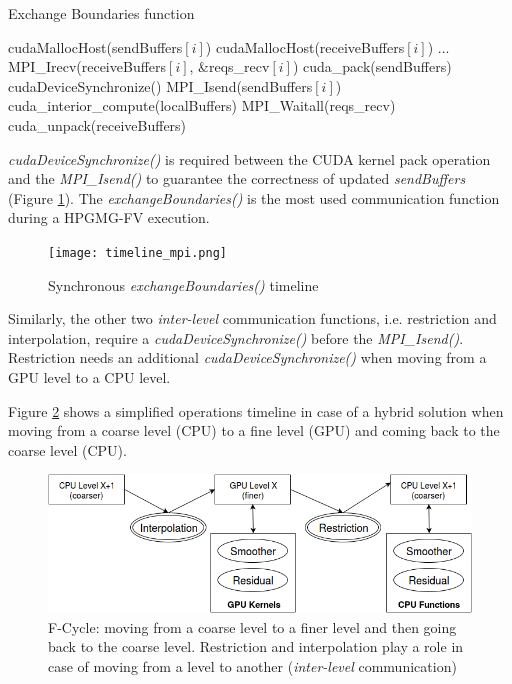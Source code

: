 \documentclass[review]{siamart1116}
\begin{document}
\begin{algorithm}
\small
\caption{Exchange Boundaries function}
\label{algo:exchange_boundaries}
\begin{algorithmic}[1]
\State cudaMallocHost(sendBuffers$[i]$)
\State cudaMallocHost(receiveBuffers$[i]$)
\EndFor
\State ...
 \label{alg:b}
                \State MPI\_Irecv(receiveBuffers$[i]$, \&reqs\_recv$[i]$)
        \EndFor
        \State cuda\_pack(sendBuffers)
        \State cudaDeviceSynchronize()
                \State MPI\_Isend(sendBuffers$[i]$)
        \EndFor
        \State cuda\_interior\_compute(localBuffers)
        \State MPI\_Waitall(reqs\_recv)
        \State cuda\_unpack(receiveBuffers)
\EndFunction
\end{algorithmic}
\end{algorithm} \textit{cudaDeviceSynchronize()} is required between the CUDA kernel
pack operation and the \textit{MPI\_Isend()} to guarantee the correctness
of updated \textit{sendBuffers} (Figure \ref{fig:timeline_mpi}).
The \textit{exchangeBoundaries()} is the most used communication function during a HPGMG-FV execution.

\begin{figure}[h]
\centering
\texttt{[image: timeline\_mpi.png]}
\caption{Synchronous \textit{exchangeBoundaries()} timeline}
\label{fig:timeline_mpi}
\end{figure}

Similarly, the other two \emph{inter-level} communication functions, i.e. restriction and interpolation, require a \textit{cudaDeviceSynchronize()} before the \textit{MPI\_Isend()}. Restriction needs an additional \textit{cudaDeviceSynchronize()} when moving from a GPU level to a CPU level.

Figure \ref{fig:hpgmg_levels} shows a simplified operations timeline
in case of a hybrid solution when moving from a coarse level (CPU) to
a fine level (GPU) and coming back to the coarse level (CPU).

\begin{figure}[h]
\centering
\includegraphics[scale=0.4]{hpgmg_levels.png}
\caption{F-Cycle: moving from a coarse level to a finer level and then going back to the coarse level. Restriction and interpolation play a role in case of moving from a level to another (\emph{inter-level} communication)}
\label{fig:hpgmg_levels}
\end{figure}
\end{document}
